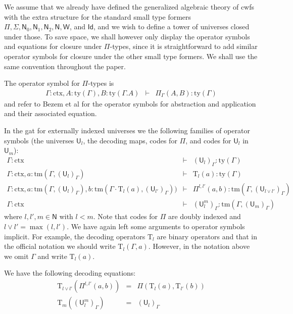 \documentclass[11pt,a4paper]{article}
\theoremstyle{definition}
\newcommand{\Id}{\mathsf{Id}}
\newcommand{\NN}{\mathsf{N}}
\newcommand{\UU}{\mathsf{U}}
\def\NN{\mathsf{N}}
\def\UU{\mathsf{U}}
\newcommand{\N}{\mathsf{N}}
\def\Pihat{\Pi}
\newcommand{\ctx}{\mathrm{ctx}}
\newcommand{\ty}{\mathrm{ty}}
\newcommand{\tm}{\mathrm{tm}}
\def\U{\mathsf{U}}
\newcommand{\Ta}{\mathrm{T}}
\def\W{\mathsf{W}}
\begin{document}
We assume that we already have defined the generalized algebraic theory of cwfs with the extra structure for the standard small type formers $\Pi, \Sigma, \N_0, \N_1, \N_2, \N, \W$, and $\Id$, and we wish to define a tower of universes closed under those. To save space, we shall however only display the operator symbols and equations for closure under $\Pi$-types, since it is straightforward to add similar operator symbols for closure under the other small type formers. We shall use the same convention throughout the paper.

The operator symbol for $\Pi$-types is
\begin{eqnarray*}
\Gamma : \ctx, A : \ty(\Gamma), B : \ty(\Gamma.A) &\vdash& \Pi_\Gamma(A,B) : \ty(\Gamma)
\end{eqnarray*}
and refer to Bezem et al \cite{bezem:hofmann} for the operator symbols for abstraction and application and their associated equation.

In the gat for externally indexed universes we the following families of operator symbols (the universes $\UU_l$, the decoding maps, codes for $\Pi$, and codes for $\UU_l$ in $\UU_m$):
\begin{eqnarray*}
\Gamma : \ctx &\vdash& (\U_{l})_\Gamma : \ty(\Gamma)\\
\Gamma : \ctx, a : \tm(\Gamma,(\U_{l})_\Gamma) &\vdash& {\Ta_{l}}(a) : \ty(\Gamma)\\
\Gamma : \ctx,
a : \tm(\Gamma,(\U_{l})_\Gamma),
b :  \tm(\Gamma \cdot \Ta_{l}(a), (\U_{l'})_\Gamma))
&\vdash&
 \Pihat^{l,l'}(a,b) : \tm(\Gamma,(\U_{l \vee l'})_\Gamma)\\
 \Gamma : \ctx&\vdash&(\UU^m_l)_\Gamma: \tm(\Gamma,(\UU_{m})_\Gamma)
\end{eqnarray*}
where $l, l' , m \in \NN$ with $l < m$. Note that codes for $\Pi$ are doubly indexed and $l \vee l' = \max(l,l')$.
We have again left some arguments to operator symbols implicit. For example, the decoding operators $\Ta_l$ are binary operators and that in the official notation we should write $\Ta_l(\Gamma,a)$. However, in the notation above we omit $\Gamma$ and write $\Ta_l(a)$.

We have the following decoding equations:
\begin{eqnarray*}
\Ta_{l \vee l'}(\Pi^{l,l'}(a,b)) &=& \Pi(\Ta_l(a),\Ta_{l'}(b))\\
\Ta_{m}((\UU^m_l)_\Gamma) &=& (\UU_l)_\Gamma
\end{eqnarray*}
\end{document}
